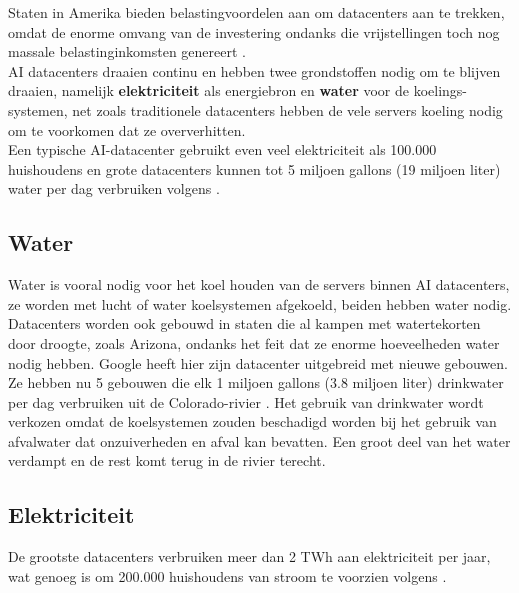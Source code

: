 Staten in Amerika bieden belastingvoordelen aan om datacenters aan te trekken, omdat de enorme omvang van de investering ondanks die vrijstellingen toch nog massale belastinginkomsten genereert \autocite{Jennings2026}. \\

AI datacenters draaien continu en hebben twee grondstoffen nodig om te blijven draaien, namelijk \textbf{elektriciteit} als energiebron en \textbf{water} voor de koelings-systemen, net zoals traditionele datacenters hebben de vele servers koeling nodig om te voorkomen dat ze oververhitten. \\

Een typische AI-datacenter gebruikt even veel elektriciteit als 100.000 huishoudens en grote datacenters kunnen tot 5 miljoen gallons (19 miljoen liter) water per dag verbruiken volgens  \textcite{CBSChicago2026}.

\subsection{Water}
\label{ssec:water}

Water is vooral nodig voor het koel houden van de servers binnen AI datacenters, ze worden met lucht of water koelsystemen afgekoeld, beiden hebben water nodig. \\

Datacenters worden ook gebouwd in staten die al kampen met watertekorten door droogte, zoals Arizona, ondanks het feit dat ze enorme hoeveelheden water nodig hebben. Google heeft hier zijn datacenter uitgebreid met nieuwe gebouwen. Ze hebben nu 5 gebouwen die elk 1 miljoen gallons (3.8 miljoen liter) drinkwater per dag verbruiken uit de Colorado-rivier \autocite{BusinessInsider2025}. Het gebruik van drinkwater wordt verkozen omdat de koelsystemen zouden beschadigd worden bij het gebruik van afvalwater dat onzuiverheden en afval kan bevatten. Een groot deel van het water verdampt en de rest komt terug in de rivier terecht.

\subsection{Elektriciteit}
\label{ssec:elektriciteit}
De grootste datacenters verbruiken meer dan 2 TWh aan elektriciteit per jaar, wat genoeg is om 200.000 huishoudens van stroom te voorzien volgens \textcite{BusinessInsider2025}. \\ 

